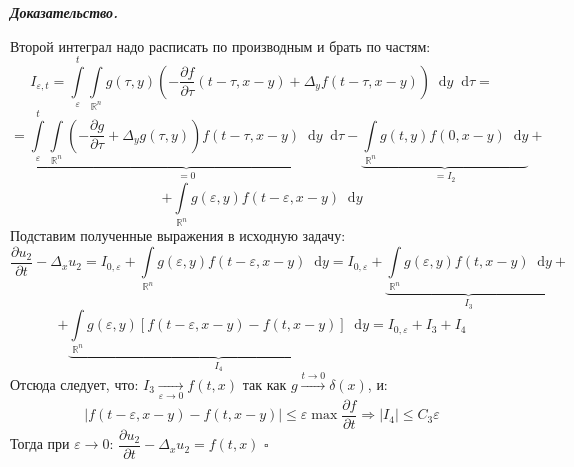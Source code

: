 \documentclass[11pt,a4paper]{report}
\numberwithin{equation}{section}
\numberwithin{figure}{chapter}
\numberwithin{table}{chapter}
\newenvironment{myproof}{%
    \begin{tcolorbox}[mathphysblock,colframe=proofcolor!65,colback=proofcolor!2,boxrule=0.5pt]
    \textit{\textbf{Доказательство.}}\par\smallskip
}{%
    \hfill$\square$
    \end{tcolorbox}
}
\newcommand{\R}{\mathbb{R}}
\newcommand{\p}{\partial}
\newcommand{\dd}{\mathop{}\!\mathrm{d}}
\newcommand{\podst}[1]{\left[ #1 \right]}
\newcommand{\skobka}[1]{\left( #1 \right)}
\renewcommand{\epsilon}{\varepsilon}
\begin{document}
\begin{myproof}
Второй интеграл надо расписать по производным и брать по частям:
\[
    I_{\epsilon,t} = \int\limits_{\epsilon}^{t}\int\limits_{\R^n}g(\tau,y)\skobka{-\dfrac{\p f}{\p \tau}(t-\tau,x-y) + \Delta_yf(t-\tau,x-y)}\dd y\dd \tau =\]
    \[=\underbrace{\int\limits_{\epsilon}^{t}\int\limits_{\R^n}\skobka{-\dfrac{\p g}{\p\tau} + \Delta_yg(\tau,y)}f(t - \tau,x-y)\dd y\dd \tau}_{=0} - \underbrace{\int\limits_{\R^n}g(t,y)f(0,x-y)\dd y}_{= I_2} +\]\[+ \int\limits_{\R^n}g(\epsilon,y)f(t-\epsilon,x-y)\dd y
    \]
    Подставим полученные выражения в исходную задачу:
     \[
    \dfrac{\p u_2}{\p t} - \Delta_xu_2 = I_{0,\epsilon} + \int\limits_{\R^n}g(\epsilon,y)f(t-\epsilon,x-y)\dd y = I_{0,\epsilon} + \underbrace{\int\limits_{\R^n}g(\epsilon,y)f(t,x-y)\dd y}_{I_3} +\]
    \[+ \underbrace{\int\limits_{\R^n}g(\epsilon,y)\podst{f(t-\epsilon,x-y) - f(t,x-y)}\dd y}_{I_4} = I_{0,\epsilon} + I_3 + I_4 
    \]
    Отсюда следует, что:
    $I_3\xrightarrow[\epsilon\to0]{}f(t,x)$ так как $g\xrightarrow{t\to 0} \delta(x)$, и:
    \[\Bigg|f(t-\epsilon,x-y)-f(t,x-y)\Bigg|\leq \epsilon\operatorname{max}\dfrac{\p f}{\p t} \Rightarrow 
    |I_4|\leq C_3\epsilon\]
     Тогда при $\epsilon\to0$: $\dfrac{\p u_2}{\p t} - \Delta_x u_2 = f(t,x)$
\end{myproof}
\end{document}
